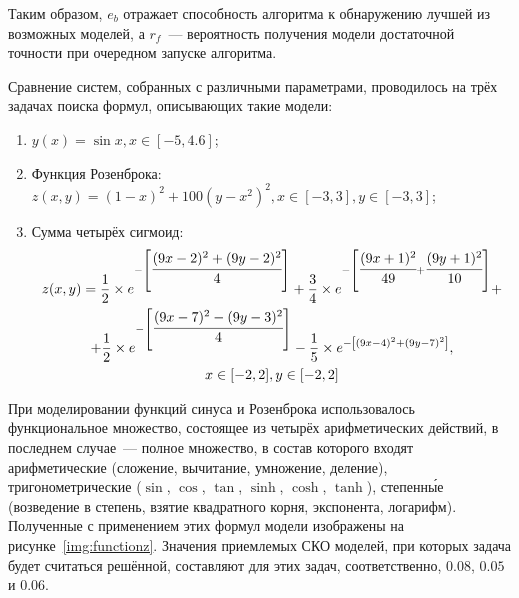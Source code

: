 Таким образом, $e_{b}$ отражает способность алгоритма к обнаружению лучшей из возможных моделей, а $r_{f}$~--- вероятность получения модели достаточной точности при очередном запуске алгоритма.

Сравнение систем, собранных с различными параметрами, проводилось на трёх задачах поиска формул, описывающих такие модели:
\begin{enumerate}
  \item $y(x) = \sin x, x \in [-5, 4.6]$;
  \item Функция Розенброка: $z(x, y) = {(1 - x)}^2 + 100 {(y - x^2)}^2, x \in [-3, 3], y \in [-3, 3]$;
  \item Сумма четырёх сигмоид:
    \begin{multline}
      z(x, y) = \frac{1}{2} \times e^{-\left\lbrack\cfrac{(9x-2)^2 + (9y-2)^2}{4}\right\rbrack} + \frac{3}{4} \times e^{-\left\lbrack\cfrac{(9x+1)^2}{49} + \cfrac{(9y+1)^2}{10}\right\rbrack} + \\
      + \frac{1}{2} \times e^{-\left\lbrack\cfrac{(9x-7)^2 - (9y-3)^2}{4}\right\rbrack} -\frac{1}{5} \times e^{-\left\lbrack(9x-4)^2 + (9y-7)^2\right\rbrack}, \\
      x \in [-2, 2], y \in [-2, 2]
    \end{multline}
\end{enumerate}

При моделировании функций синуса и Розенброка использовалось функциональное множество, состоящее из четырёх арифметических действий, в последнем случае~--- полное множество, в состав которого входят арифметические (сложение, вычитание, умножение, деление), тригонометрические ($\sin$, $\cos$, $\tan$, $\sinh$, $\cosh$, $\tanh$), степенн\'{ы}е (возведение в степень, взятие квадратного корня, экспонента, логарифм). Полученные с применением этих формул модели изображены на рисунке~\ref{img:functionz}. Значения приемлемых СКО моделей, при которых задача будет считаться решённой, составляют для этих задач, соответственно, $0.08$, $0.05$ и $0.06$.

